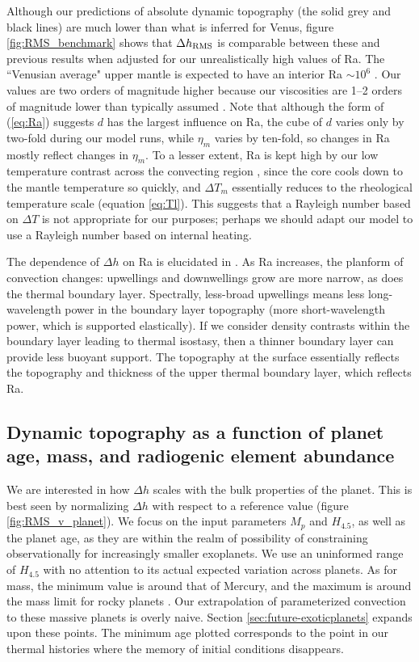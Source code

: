 Although our predictions of absolute dynamic topography (the solid grey and black lines) are much lower than what is inferred for Venus, figure \ref{fig:RMS_benchmark} shows that $\Delta h_{\rm RMS}$ is comparable between these and previous results when adjusted for our unrealistically high values of Ra. The ``Venusian average" upper mantle is expected to have an interior Ra $\sim 10^6$ \citep{Kiefer1998}. Our values are two orders of magnitude higher because our viscosities are 1--2 orders of magnitude lower than typically assumed \citep[cf.][]{Benesova2012}. Note that although the form of (\ref{eq:Ra}) suggests $d$ has the largest influence on Ra, the cube of $d$ varies only by two-fold during our model runs, while $\eta_m$ varies by ten-fold, so changes in Ra mostly reflect changes in $\eta_m$. To a lesser extent, Ra is kept high by our low temperature contrast across the convecting region \citep[$\sim$300 K; cf. 1000 K assumed by][]{Kiefer1992}, since the core cools down to the mantle temperature so quickly, and $\Delta T_m$ essentially reduces to the rheological temperature scale (equation \ref{eq:Tl}). This suggests that a Rayleigh number based on $\Delta T$ is not appropriate for our purposes; perhaps we should adapt our model to use a Rayleigh number based on internal heating.





The dependence of $\Delta h$ on Ra is elucidated in \citet{Kiefer1992}. As Ra increases, the planform of convection changes: upwellings and downwellings grow are more narrow, as does the thermal boundary layer. Spectrally, less-broad upwellings means less long-wavelength power in the boundary layer topography (more short-wavelength power, which is supported elastically). If we consider density contrasts within the boundary layer leading to thermal isostasy, then a thinner boundary layer can provide less buoyant support. The topography at the surface essentially reflects the topography and thickness of the upper thermal boundary layer, which reflects Ra. 


\subsection{Dynamic topography as a function of planet age, mass, and radiogenic element abundance}

We are interested in how $\Delta h$ scales with the bulk properties of the planet. This is best seen by normalizing $\Delta h$ with respect to a reference value (figure \ref{fig:RMS_v_planet}). We focus on the input parameters $M_p$ and $H_{4.5}$, as well as the planet age, as they are within the realm of possibility of constraining observationally for increasingly smaller exoplanets. We use an uninformed range of $H_{4.5}$ with no attention to its actual expected variation across planets. As for mass, the minimum value is around that of Mercury, and the maximum is around the mass limit for rocky planets \citep{Rogers2015}. Our extrapolation of parameterized convection to these massive planets is overly naive. Section \ref{sec:future-exoticplanets} expands upon these points. The minimum age plotted corresponds to the point in our thermal histories where the memory of initial conditions disappears.

